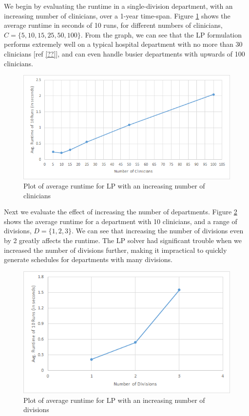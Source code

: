 We begin by evaluating the runtime in a single-division department, with an increasing number of clinicians, over a 1-year time-span. Figure \ref{fig:avg-runtime-clinicians} shows the average runtime in seconds of 10 runs, for different numbers of clinicians, $C = \{5, 10, 15, 25, 50, 100\}$. From the graph, we can see that the LP formulation performs extremely well on a typical hospital department with no more than 30 clinicians [ref \ref{??}], and can even handle busier departments with upwards of 100 clinicians. \\

\begin{figure}[h]
	\centering
	\includegraphics[scale=.7]{fig/avg_runtime_clinicians}
	\caption{Plot of average runtime for LP with an increasing number of clinicians}
	\label{fig:avg-runtime-clinicians}
\end{figure}

Next we evaluate the effect of increasing the number of departments. Figure \ref{fig:avg-runtime-divisions} shows the average runtime for a department with 10 clinicians, and a range of divisions, $D = \{1, 2, 3\}$. We can see that increasing the number of divisions even by 2 greatly affects the runtime. The LP solver had significant trouble when we increased the number of divisions further, making it impractical to quickly generate schedules for departments with many divisions. \\

\begin{figure}[h]
	\centering
	\includegraphics[scale=.7]{fig/avg_runtime_divisions}
	\caption{Plot of average runtime for LP with an increasing number of divisions}
	\label{fig:avg-runtime-divisions}
\end{figure}

